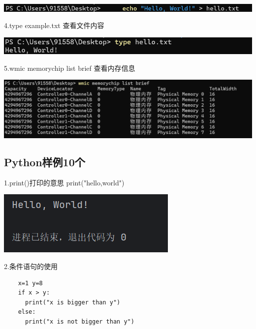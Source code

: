 \documentclass{article}
\begin{document}
\noindent
\begin{minipage}{\linewidth}
	\centering
	\includegraphics[width=0.5\linewidth]{echo.png}
	\label{fig:example}
\end{minipage}


4.type example.txt
查看文件内容

\noindent
\begin{minipage}{\linewidth}
	\centering
	\includegraphics[width=0.5\linewidth]{type.png}
	\label{fig:example}
\end{minipage}

5.wmic memorychip list brief
查看内存信息

\noindent
\begin{minipage}{\linewidth}
	\centering
	\includegraphics[width=0.5\linewidth]{wmic.png}
	\label{fig:example}
\end{minipage}

\subsection{Python样例10个}

1.print()打印的意思
print("hello,world")

\noindent
\begin{minipage}{\linewidth}
  \centering
  \includegraphics[width=0.5\linewidth]{print.png}
  \label{fig:example}
\end{minipage}


2.条件语句的使用
\begin{verbatim}
    x=1 y=8
    if x > y:
      print("x is bigger than y")
    else:
      print("x is not bigger than y")

 \end{verbatim}
\end{document}
